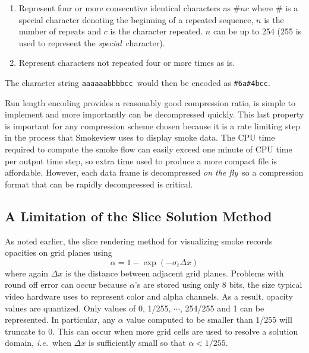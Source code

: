 {\begin{enumerate}
\item Represent four or more consecutive identical characters as
$\# n c$ where $\#$ is a special character denoting the beginning
of a repeated sequence, $n$ is the number of repeats and $c$ is
the character repeated.  $n$ can be up to 254 (255 is used to
represent the {\em special}\ character).
\item Represent
characters not repeated four or more times as is.
\end{enumerate}

The character string {\tt aaaaaabbbbcc}\ would then be encoded as
{\tt \#6a\#4bcc}.

Run length encoding provides a reasonably good compression ratio,
is simple to implement and more importantly can be decompressed
quickly. This last property is important for any compression
scheme chosen because it is a rate limiting step in the process
that Smokeview uses to display smoke data. The CPU time required
to compute the smoke flow can easily exceed one minute of CPU time
per output time step, so extra time used to produce a more compact
file is affordable. However, each data frame is decompressed {\em
on the fly}\ so a compression format that can be rapidly
decompressed is critical.


\subsection{A Limitation of the Slice Solution Method}
As noted earlier, the slice rendering method for visualizing smoke
records opacities on grid planes using
\begin{equation}
\label{eq:alpha3}
\alpha=1-\exp(-\sigma_t\Delta x)
\end{equation}
where again $\Delta x$ is the distance between adjacent grid
planes.  Problems with round off error can occur because
$\alpha$'s are stored using only 8 bits, the size typical video
hardware uses to represent color and alpha channels. As a result,
opacity values are quantized.  Only values of 0, 1/255, $\cdots$,
254/255 and 1 can be represented.  In particular, any $\alpha$
value computed to be smaller than $1/255$ will truncate to 0. This
can occur when more grid cells are used to resolve a solution
domain, {\em i.e.}\ when $\Delta x$ is sufficiently small so that
$\alpha<1/255$.

}
